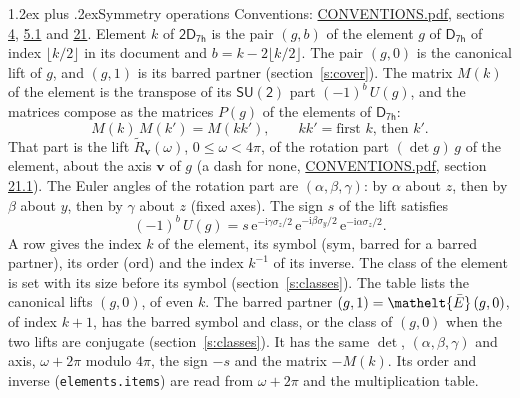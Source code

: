 \documentclass[10pt,a4paper]{article}
\makeatletter
\renewcommand\section{\@startsection{section}{1}{\z@}{-3ex plus -1ex minus -.2ex}%
  {1.2ex plus .2ex}{\normalfont\large\sffamily\bfseries\color{parttitle}}}
\numberwithin{equation}{section}
\newcommand{\eltfont}[1]{{\let\sigma\eltsigma\mathelt{#1}}}
\newcommand{\grp}[1]{\mathsf{#1}}
\newcommand{\elt}[1]{\eltfont{#1}}
\newcommand{\vv}{\mathbf{v}}
\newcommand{\iunit}{\mathrm{i}}
\newcommand{\expe}{\mathrm{e}}
\newcommand{\barred}[1]{\bar{#1}}
\newcommand{\lift}[1]{\tilde{#1}}
\newcommand{\pauli}[1]{\sigma_{#1}}
\makeatother
\begin{document}
\section{Symmetry operations}\label{s:elements}
Conventions: \href{../../CONVENTIONS.pdf}{CONVENTIONS.pdf}, sections \href{../../../rotation/CONVENTIONS.pdf\#conv.4}{4}, \href{../../../rotation/CONVENTIONS.pdf\#conv.5.1}{5.1} and \href{../../CONVENTIONS.pdf\#conv.21}{21}.
\leavevmode\label{n:index.element}\label{n:element.g}Element $k$ of $\grp{2D_{7h}}$ is the pair $(g, b)$ of the element $g$ of \href{../../../rotation/data/pdf/D7h.pdf}{$\grp{D_{7h}}$} of index $\lfloor k/2\rfloor$ in its document and $b = k - 2\lfloor k/2\rfloor$. The pair $(g, 0)$ is the canonical lift of $g$, and $(g, 1)$ is its barred partner (section~\ref{s:cover}). \label{n:matrix.element.pin}\label{n:matrix.element}The matrix $M(k)$ of the element is the transpose of its $\grp{SU(2)}$ part $(-1)^{b}\,U(g)$, and the matrices compose as the matrices $P(g)$ of the elements of $\grp{D_{7h}}$:
\begin{equation}\label{e:mprod}M(k)\,M(k') = M(kk'),\qquad kk' = \text{first } k\text{, then } k'.\end{equation}
\leavevmode\label{n:angle.omega}\label{n:vector.axis}\label{n:vector.pole}That part is the lift $\lift{R}_{\vv}(\omega)$, $0 \le \omega < 4\pi$, of the rotation part $(\det g)\,g$ of the element, about the axis $\vv$ of $g$ (a dash for none, \href{../../CONVENTIONS.pdf}{CONVENTIONS.pdf}, section \href{../../CONVENTIONS.pdf\#conv.21.1}{21.1}). \label{n:angle.euler.alpha}\label{n:angle.euler.beta}\label{n:angle.euler.gamma}\label{n:vector.coordinates}The Euler angles of the rotation part are $(\alpha,\beta,\gamma)$: by $\alpha$ about $z$, then by $\beta$ about $y$, then by $\gamma$ about $z$ (fixed axes). \label{n:local.euler.sign}The sign $s$ of the lift satisfies
\begin{equation}\label{e:euler}(-1)^{b}\,U(g) = s\,\expe^{-\iunit\gamma\pauli{z}/2}\,\expe^{-\iunit\beta\pauli{y}/2}\,\expe^{-\iunit\alpha\pauli{z}/2}.\end{equation}
\leavevmode\label{n:index.element.inverse}\label{n:head.sym}\label{n:head.ord}A row gives the index $k$ of the element, its symbol (sym, barred for a barred partner), its order (ord) and the index $k^{-1}$ of its inverse. \label{n:head.class}The class of the element is set with its size before its symbol (section~\ref{s:classes}).
The table lists the canonical lifts $(g, 0)$, of even $k$. The barred partner $(g, 1) = \elt{\barred{E}}\,(g, 0)$, of index $k + 1$, has the barred symbol and class, or the class of $(g, 0)$ when the two lifts are conjugate (section~\ref{s:classes}). It has the same $\det$, $(\alpha,\beta,\gamma)$ and axis, $\omega + 2\pi$ modulo $4\pi$, the sign $-s$ and the matrix $-M(k)$. Its order and inverse (\texttt{elements.items}) are read from $\omega + 2\pi$ and the multiplication table.
\end{document}
